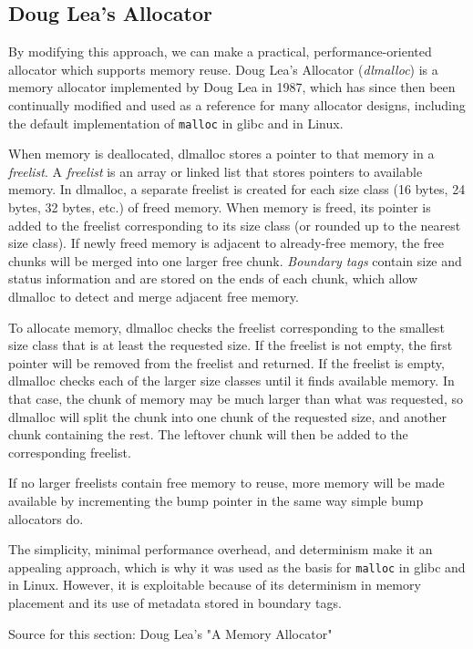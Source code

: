 \documentclass[conference]{IEEEtran}
\begin{document}
\subsection{Doug Lea's Allocator}
By modifying this approach, we can make a practical, performance-oriented allocator which supports memory reuse.
Doug Lea's Allocator (\emph{dlmalloc}) is a memory allocator implemented by Doug Lea in 1987, which has since then been continually modified and used as a reference for many allocator designs, including the default implementation of \verb|malloc| in glibc and in Linux.

When memory is deallocated, dlmalloc stores a pointer to that memory in a \emph{freelist}.
A \emph{freelist} is an array or linked list that stores pointers to available memory.
In dlmalloc, a separate freelist is created for each size class (16 bytes, 24 bytes, 32 bytes, etc.) of freed memory.
When memory is freed, its pointer is added to the freelist corresponding to its size class (or rounded up to the nearest size class).
If newly freed memory is adjacent to already-free memory, the free chunks will be merged into one larger free chunk.
\emph{Boundary tags} contain size and status information and are stored on the ends of each chunk, which allow dlmalloc to detect and merge adjacent free memory.

To allocate memory, dlmalloc checks the freelist corresponding to the smallest size class that is at least the requested size.
If the freelist is not empty, the first pointer will be removed from the freelist and returned.
If the freelist is empty, dlmalloc checks each of the larger size classes until it finds available memory.
In that case, the chunk of memory may be much larger than what was requested, so dlmalloc will split the chunk into one chunk of the requested size, and another chunk containing the rest.
The leftover chunk will then be added to the corresponding freelist.

If no larger freelists contain free memory to reuse, more memory will be made available by incrementing the bump pointer in the same way simple bump allocators do.

The simplicity, minimal performance overhead, and determinism make it an appealing approach, which is why it was used as the basis for \verb|malloc| in glibc and in Linux.
However, it is exploitable because of its determinism in memory placement and its use of metadata stored in boundary tags.

	{\color{red} Source for this section: Doug Lea's "A Memory Allocator" }
\end{document}
